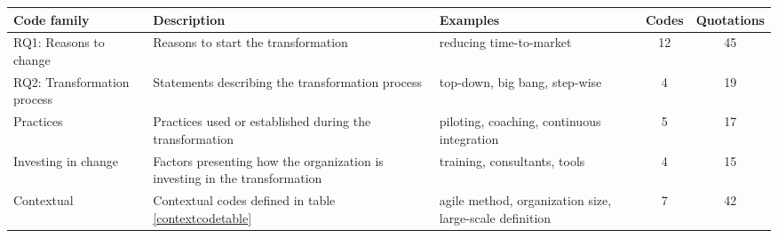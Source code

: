 \centering

 \label{codefamilytable}
\begin{center}
    \begin{tabular}{l p{10em} p{11em} c c }
        \bfseries{Code family} & \bfseries{Description} & \bfseries{Examples} & \bfseries{Codes} & \bfseries{Quotations}\\
        \hline
        RQ1: Reasons to change & Reasons to start the transformation & reducing time-to-market & 12& 45 \\
        RQ2: Transformation process & Statements describing the transformation process & top-down, big bang, step-wise & 4 & 19 \\
        Practices & Practices used or established during the transformation & piloting, coaching, continuous integration & 5 & 17 \\
        Investing in change & Factors presenting how the organization is investing in the transformation & training, consultants, tools & 4 & 15 \\
        Contextual & Contextual codes defined in table \ref{contextcodetable} & agile method, organization size, large-scale definition & 7 & 42 \\
        \hline
    \end{tabular}
\end{center}
\justify
